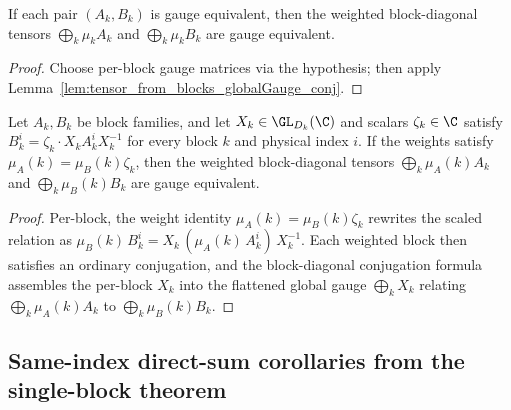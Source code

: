 \begin{lemma}%
    \label{lem:gauge_equiv_from_block_gauge}
    \leanok
    If each pair $(A_k, B_k)$ is gauge equivalent, then the weighted
    block-diagonal tensors $\bigoplus_k \mu_k A_k$ and
    $\bigoplus_k \mu_k B_k$ are gauge equivalent.
\end{lemma}

\begin{proof}\leanok
    Choose per-block gauge matrices via the hypothesis; then apply
    Lemma~\ref{lem:tensor_from_blocks_globalGauge_conj}.
\end{proof}

\begin{lemma}%
    \label{lem:gauge_equiv_block_gauge_phase_weight}
    \leanok
    Let $A_k, B_k$ be block families, and let $X_k \in \GL_{D_k}(\C)$
    and scalars $\zeta_k \in \C$ satisfy
    $B_k^i = \zeta_k \cdot X_k A_k^i X_k^{-1}$ for every block $k$ and
    physical index $i$. If the weights satisfy $\mu_A(k) = \mu_B(k) \zeta_k$,
    then the weighted block-diagonal tensors
    $\bigoplus_k \mu_A(k) A_k$ and $\bigoplus_k \mu_B(k) B_k$ are gauge
    equivalent.
\end{lemma}

\begin{proof}\leanok
    Per-block, the weight identity $\mu_A(k) = \mu_B(k) \zeta_k$ rewrites the
    scaled relation as
    $\mu_B(k)\,B_k^i = X_k\,(\mu_A(k)\,A_k^i)\,X_k^{-1}$.
    Each weighted block then satisfies an ordinary conjugation, and the
    block-diagonal conjugation formula assembles the per-block $X_k$ into the
    flattened global gauge $\bigoplus_k X_k$ relating
    $\bigoplus_k \mu_A(k) A_k$ to $\bigoplus_k \mu_B(k) B_k$.
\end{proof}

\subsection{Same-index direct-sum corollaries from the single-block theorem}%
\label{subsec:ft_block_sum_corollaries}


